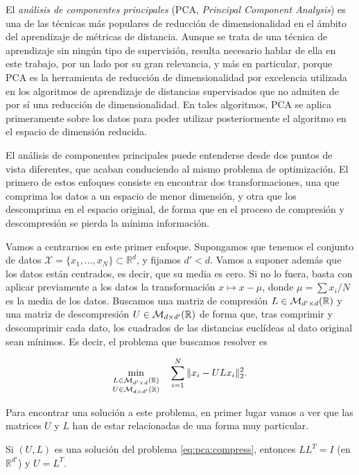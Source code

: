 El \emph{análisis de componentes principales} (PCA, \emph{Principal Component Analysis}) es una de las técnicas más populares de reducción de dimensionalidad en el ámbito del aprendizaje de métricas de distancia. Aunque se trata de una técnica de aprendizaje sin ningún tipo de supervisión, resulta necesario hablar de ella en este trabajo, por un lado por su gran relevancia, y más en particular, porque PCA es la herramienta de reducción de dimensionalidad por excelencia utilizada en los algoritmos de aprendizaje de distancias supervisados que no admiten de por sí una reducción de dimensionalidad. En tales algoritmos, PCA se aplica primeramente sobre los datos para poder utilizar posteriormente el algoritmo en el espacio de dimensión reducida.

El análisis de componentes principales puede entenderse desde dos puntos de vista diferentes, que acaban conduciendo al mismo problema de optimización. El primero de estos enfoques consiste en encontrar dos transformaciones, una que comprima los datos a un espacio de menor dimensión, y otra que los descomprima en el espacio original, de forma que en el proceso de compresión y descompresión se pierda la mínima información.

Vamos a centrarnos en este primer enfoque. Supongamos que tenemos el conjunto de datos $\mathcal{X} = \{x_1,\dots,x_N\} \subset \mathbb{R}^d$, y fijamos $d' < d$. Vamos a suponer además que los datos están centrados, es decir, que su media es cero. Si no lo fuera, basta con aplicar previamente a los datos la transformación $x \mapsto x - \mu$, donde $\mu = \sum x_i / N$ es la media de los datos. Buscamos una matriz de compresión $L \in \mathcal{M}_{d'\times d}(\mathbb{R})$ y una matriz de descompresión $U \in \mathcal{M}_{d\times d'}(\mathbb{R})$ de forma que, tras comprimir y descomprimir cada dato, los cuadrados de las distancias euclídeas al dato original sean mínimos. Es decir, el problema que buscamos resolver es

\begin{equation} \label{eq:pca:compress}
    \min_{\substack{L \in \mathcal{M}_{d'\times d}(\mathbb{R}) \\ U \in \mathcal{M}_{d\times d'}(\mathbb{R})}} \quad \sum_{i=1}^{N} \|x_i - ULx_i\|_2^2.
\end{equation}

Para encontrar una solución a este problema, en primer lugar vamos a ver que las matrices $U$ y $L$ han de estar relacionadas de una forma muy particular.

\begin{lem}
    Si $(U,L)$ es una solución del problema \ref{eq:pca:compress}, entonces $LL^T = I$ (en $\mathbb{R}^{d'}$) y $U = L^T$.
\end{lem}

